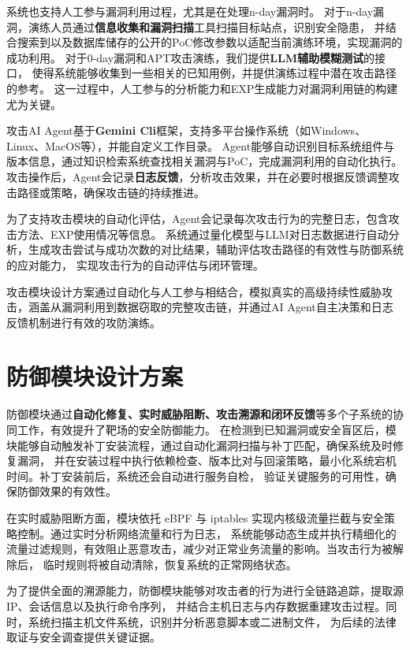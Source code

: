 \documentclass[lang=cn,10pt]{elegantbook}
\begin{document}
系统也支持人工参与漏洞利用过程，尤其是在处理n-day漏洞时。
对于n-day漏洞，演练人员通过\textbf{信息收集和漏洞扫描}工具扫描目标站点，识别安全隐患，
并结合搜索到以及数据库储存的公开的PoC修改参数以适配当前演练环境，实现漏洞的成功利用。
对于0-day漏洞和APT攻击演练，我们提供\textbf{LLM辅助模糊测试}的接口，
使得系统能够收集到一些相关的已知用例，并提供演练过程中潜在攻击路径的参考。
这一过程中，人工参与的分析能力和EXP生成能力对漏洞利用链的构建尤为关键。

攻击AI Agent基于\textbf{Gemini Cli}框架，支持多平台操作系统（如Windows、Linux、MacOS等），并能自定义工作目录。
Agent能够自动识别目标系统组件与版本信息，通过知识检索系统查找相关漏洞与PoC，完成漏洞利用的自动化执行。
攻击操作后，Agent会记录\textbf{日志反馈}，分析攻击效果，并在必要时根据反馈调整攻击路径或策略，确保攻击链的持续推进。

为了支持攻击模块的自动化评估，Agent会记录每次攻击行为的完整日志，包含攻击方法、EXP使用情况等信息。
系统通过量化模型与LLM对日志数据进行自动分析，生成攻击尝试与成功次数的对比结果，辅助评估攻击路径的有效性与防御系统的应对能力，
实现攻击行为的自动评估与闭环管理。

\begin{definition}
攻击模块设计方案通过自动化与人工参与相结合，模拟真实的高级持续性威胁攻击，涵盖从漏洞利用到数据窃取的完整攻击链，并通过AI Agent自主决策和日志反馈机制进行有效的攻防演练。
\end{definition}

\section{防御模块设计方案}

防御模块通过\textbf{自动化修复、实时威胁阻断、攻击溯源和闭环反馈}等多个子系统的协同工作，有效提升了靶场的安全防御能力。
在检测到已知漏洞或安全盲区后，模块能够自动触发补丁安装流程，通过自动化漏洞扫描与补丁匹配，确保系统及时修复漏洞，
并在安装过程中执行依赖检查、版本比对与回滚策略，最小化系统宕机时间。补丁安装前后，系统还会自动进行服务自检，
验证关键服务的可用性，确保防御效果的有效性。

在实时威胁阻断方面，模块依托 eBPF 与 iptables 实现内核级流量拦截与安全策略控制。通过实时分析网络流量和行为日志，
系统能够动态生成并执行精细化的流量过滤规则，有效阻止恶意攻击，减少对正常业务流量的影响。当攻击行为被解除后，
临时规则将被自动清除，恢复系统的正常网络状态。

为了提供全面的溯源能力，防御模块能够对攻击者的行为进行全链路追踪，提取源 IP、会话信息以及执行命令序列，
并结合主机日志与内存数据重建攻击过程。同时，系统扫描主机文件系统，识别并分析恶意脚本或二进制文件，
为后续的法律取证与安全调查提供关键证据。
\end{document}
